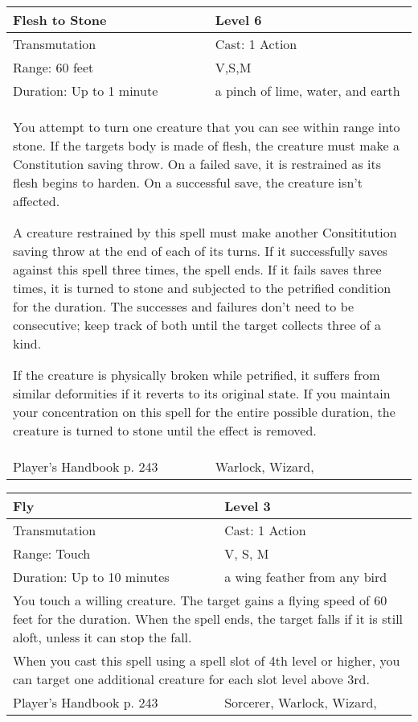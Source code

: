 \documentclass[11pt]{report}
\begin{document}
\begin{table}[H]
	\begin{tabular}{||p{6cm}|p{6cm}||}
		\hline\hline
		\bf{Flesh to Stone} & Level 6\\ \hline
		Transmutation & Cast: 1 Action\\ \hline
		Range: 60 feet & V,S,M\\ \hline
		Duration: Up to 1 minute & a pinch of lime, water, and earth\\ \hline
		\multicolumn{2}{||p{12cm}||}{You attempt to turn one creature that you can see within range into stone.
If the targets body is made of flesh, the creature must make a Constitution saving throw. On a failed save, it is restrained as its flesh begins to harden. On a successful save, the creature isn’t affected.

A creature restrained by this spell must make another Consititution saving throw at the end of each of its turns. If it successfully saves against this spell three times, the spell ends. If it fails saves three times, it is turned to stone and subjected to the petrified condition for the duration. The successes and failures don’t need to be consecutive; keep track of both until the target collects three of a kind.

If the creature is physically broken while petrified, it suffers from similar deformities if it reverts to its original state. If you maintain your concentration on this spell for the entire possible duration, the creature is turned to stone until the effect is removed.}\\ \hline
Player's Handbook p. 243 & Warlock, Wizard, \\ \hline\hline
	\end{tabular}
\end{table}

\begin{table}[H]
	\begin{tabular}{||p{6cm}|p{6cm}||}
		\hline\hline
		\bf{Fly} & Level 3\\ \hline
		Transmutation & Cast: 1 Action\\ \hline
		Range: Touch & V, S, M\\ \hline
		Duration: Up to 10 minutes & a wing feather from any bird\\ \hline
		\multicolumn{2}{||p{12cm}||}{You touch a willing creature. The target gains a flying speed of 60 feet for the duration. When the spell ends, the target falls if it is still aloft, unless it can stop the fall.}\\ \hline
		\multicolumn{2}{||p{12cm}||}{When you cast this spell using a spell slot of 4th level or higher, you can target one additional creature for each slot level above 3rd.}\\ \hline
Player's Handbook p. 243 & Sorcerer, Warlock, Wizard, \\ \hline\hline
	\end{tabular}
\end{table}
\end{document}
